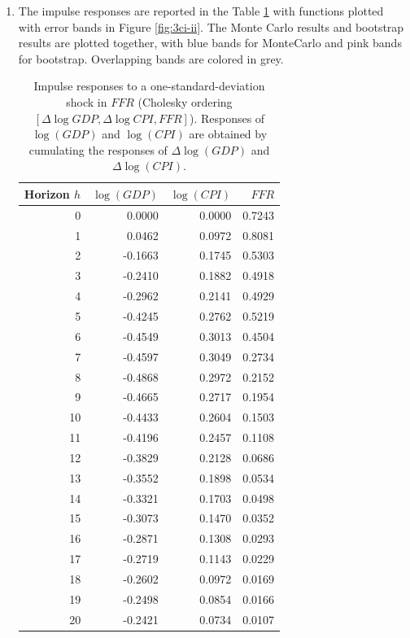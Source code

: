 \documentclass[12pt]{article}
\begin{document}
\begin{enumerate}[label=\alph*.]
   \newpage
   \item The impulse responses are reported in the Table \ref{tab:3ci} with functions plotted with error bands in Figure \ref{fig:3ci-ii}. The Monte Carlo results and bootstrap results are plotted together, with blue bands for MonteCarlo and pink bands for bootstrap. Overlapping bands are colored in grey.
   \begin{table}[H]
   \centering
   \caption{Impulse responses to a one-standard-deviation shock in \(FFR\) (Cholesky ordering \([\Delta \log GDP, \Delta \log CPI, FFR]\)). Responses of \(\log(GDP)\) and \(\log(CPI)\) are obtained by cumulating the responses of \(\Delta \log(GDP)\) and \(\Delta \log(CPI)\).}
   \scriptsize
   \begin{tabular}{r r r r}
   \hline
   Horizon \(h\) & \(\log(GDP)\) & \(\log(CPI)\) & \(FFR\) \\
   \hline
   0  &  0.0000 &  0.0000 & 0.7243 \\
   1  &  0.0462 &  0.0972 & 0.8081 \\
   2  & -0.1663 &  0.1745 & 0.5303 \\
   3  & -0.2410 &  0.1882 & 0.4918 \\
   4  & -0.2962 &  0.2141 & 0.4929 \\
   5  & -0.4245 &  0.2762 & 0.5219 \\
   6  & -0.4549 &  0.3013 & 0.4504 \\
   7  & -0.4597 &  0.3049 & 0.2734 \\
   8  & -0.4868 &  0.2972 & 0.2152 \\
   9  & -0.4665 &  0.2717 & 0.1954 \\
   10 & -0.4433 &  0.2604 & 0.1503 \\
   11 & -0.4196 &  0.2457 & 0.1108 \\
   12 & -0.3829 &  0.2128 & 0.0686 \\
   13 & -0.3552 &  0.1898 & 0.0534 \\
   14 & -0.3321 &  0.1703 & 0.0498 \\
   15 & -0.3073 &  0.1470 & 0.0352 \\
   16 & -0.2871 &  0.1308 & 0.0293 \\
   17 & -0.2719 &  0.1143 & 0.0229 \\
   18 & -0.2602 &  0.0972 & 0.0169 \\
   19 & -0.2498 &  0.0854 & 0.0166 \\
   20 & -0.2421 &  0.0734 & 0.0107 \\
   \hline
   \end{tabular}
   \label{tab:3ci}
   \end{table}


\end{enumerate}
\end{document}
